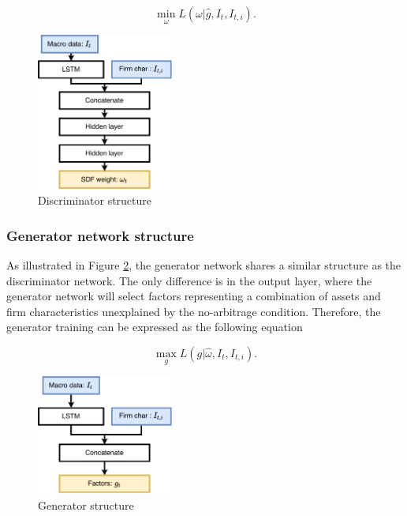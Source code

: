 \documentclass[12pt]{article}
\begin{document}
\[
\min_{\omega} L(\omega|\hat{g}, I_t, I_{t,i}).
\]

\begin{figure}
\centering
\includegraphics[width=0.4\textwidth,height=\textheight]{./src/discriminator}
\caption{\label{fig:discriminator}Discriminator structure}
\end{figure}

\hypertarget{generator-network-structure}{%
\subsubsection{Generator network structure}\label{generator-network-structure}}

As illustrated in Figure \ref{fig:generator}, the generator network shares
a similar structure as the discriminator network.
The only difference is in the output layer, where the generator
network will select factors representing a
combination of assets and firm characteristics unexplained by
the no-arbitrage condition. Therefore, the
generator training can be expressed as the following equation

\[
\max_{g} L(g|\hat\omega, I_t, I_{t,i}).
\]

\begin{figure}
\centering
\includegraphics[width=0.4\textwidth,height=\textheight]{./src/generator}
\caption{\label{fig:generator}Generator structure}
\end{figure}
\end{document}
